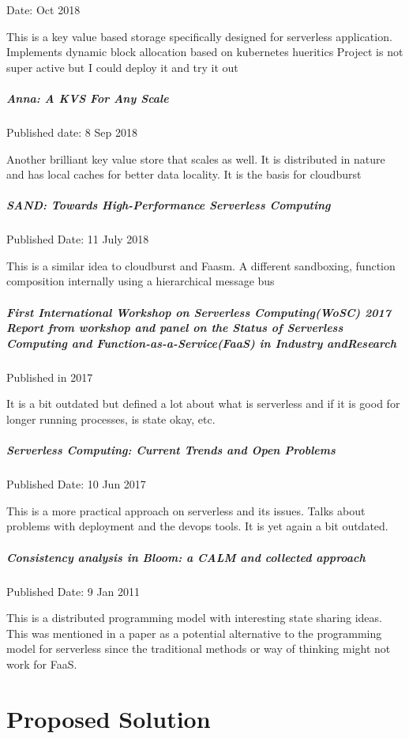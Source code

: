 \documentclass[12pt,titlepage]{article}
\begin{document}
Date: Oct 2018

This is a key value based storage specifically designed for serverless application. 
Implements dynamic block allocation based on kubernetes hueritics 
Project is not super active but I could deploy it and try it out

\subparagraph{Anna: A KVS For Any Scale}
\label{sec:org0a25136}

Published date: 8 Sep 2018

Another brilliant key value store that scales as well. It is distributed in nature and has local caches for better data locality. It is the basis for cloudburst

\subparagraph{SAND: Towards High-Performance Serverless Computing}
\label{sec:org306f466}

Published Date: 11 July 2018

This is a similar idea to cloudburst and Faasm. A different sandboxing, function composition internally using a hierarchical message bus

\subparagraph{First ​​International​​ Workshop​​ on​​ Serverless Computing​​(WoSC) ​​2017 Report​​ from​​ workshop ​​and​​ panel ​​on ​​the​​ Status ​​of Serverless ​​Computing​​ and ​​Function-as-a-Service(FaaS) ​​in​​ Industry ​​and​​ Research}
\label{sec:org900c6ef}

Published in 2017

It is a bit outdated but defined a lot about what is serverless and if it is good for longer running processes, is state okay, etc.

\subparagraph{Serverless Computing: Current Trends and Open Problems}
\label{sec:orga5454e5}

Published Date: 10 Jun 2017

This is a more practical approach on serverless and its issues.
Talks about problems with deployment and the devops tools. 
It is yet again a bit outdated. 

\subparagraph{Consistency analysis in Bloom: a CALM and collected approach}
\label{sec:orgbd7bad8}

Published Date: 9 Jan 2011

This is a distributed programming model with interesting state sharing ideas. This was mentioned in a paper as a potential alternative to the programming model for serverless since the traditional methods or way of thinking might not work for FaaS.

\section{Proposed Solution}
\label{sec:org64ffd4e}
\end{document}
